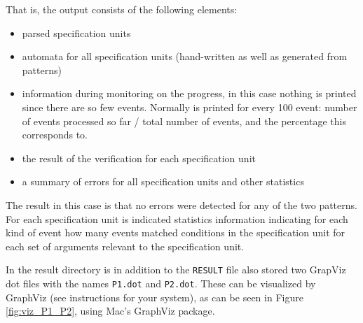 \documentclass{report}
\begin{document}
\noindent That is, the output consists of the following elements:

\begin{itemize}
  \item parsed specification units
  \item automata for all specification units (hand-written as well as generated from patterns)
  \item information during monitoring on the progress, in this case nothing is printed since there are so few events.
  Normally is printed for every 100 event: number of events processed so far / total number of events, and the percentage
  this corresponds to.
  \item the result of the verification for each specification unit
  \item a summary of errors for all specification units and other statistics
\end{itemize}

\noindent The result in this case is that no errors were detected for any of the two patterns. For each specification unit is indicated statistics information indicating for each kind of
event how many events matched conditions in the specification unit for each
set of arguments relevant to the specification unit.

In the result directory is in addition to the {\tt RESULT} file also stored two GrapViz dot files with the names {\tt P1.dot} and {\tt P2.dot}. These can be visualized by 
GraphViz (see instructions \cite{graphviz} for your system), as can be seen in
Figure \ref{fig:viz_P1_P2}, using Mac's GraphViz package.
\end{document}
